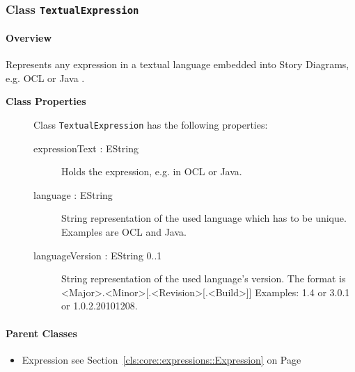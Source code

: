 \subsubsection{\Large{Class \bfseries \texttt{TextualExpression}\normalfont}}
\label{cls:core::expressions::TextualExpression} 
\paragraph{Overview}

	
			
Represents any expression in a textual language embedded into Story Diagrams, e.g. OCL or Java .	
		
	


\begin{description}

	\item[\textbf{Class Properties}] Class \texttt{TextualExpression} has the following properties:
	\begin{description}
\item[expressionText : EString 	]

\hspace{\fill}
\nopagebreak


	
			
Holds the expression, e.g. in OCL or Java.	
		
	
\item[language : EString 	]

\hspace{\fill}
\nopagebreak


	
			
String representation of the used language which has to be unique. Examples are OCL and Java.	
		
	
\item[languageVersion : EString 			0..1]

\hspace{\fill}
\nopagebreak


	
			
String representation of the used language's version. The format is <Major>.<Minor>[.<Revision>[.<Build>]]
Examples: 1.4 or 3.0.1 or 1.0.2.20101208.	
		
	
	\end{description}
	
	

\end{description}

\paragraph{Parent Classes}
\begin{itemize}
\item Expression see Section~\ref{cls:core::expressions::Expression} on Page~\pageref{cls:core::expressions::Expression}\end{itemize}
\newpage
		


